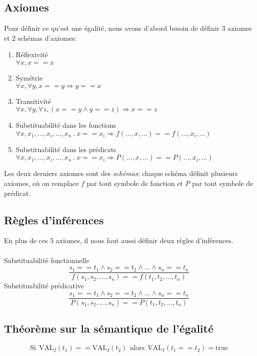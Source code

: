 {\subsection{Axiomes} 
Pour définir ce qu'est une égalité, nous avons d'abord besoin de définir 3 axiomes et 2 schémas d'axiomes:
\begin{enumerate}
\item Réflexivité \\$\forall x, x==x$
\item Symétrie \\$\forall x, \forall y, x==y \Rightarrow y==x$
\item Transitivité \\$\forall x, \forall y, \forall z, (x==y \land y==z) \Rightarrow x==z$
\item Substituabilité dans les fonctions\\$\forall x, x_{1}, ..., x_i, ..., x_{n}\ .\ x==x_i \Rightarrow f(..., x, ...) == f(..., x_i, ...)$
\item Substituabilité dans les prédicats\\$\forall x, x_{1}, ..., x_i, ..., x_{n}\ .\ x==x_i \Rightarrow P(..., x, ...) == P(..., x_i, ...)$ 
\end{enumerate}
Les deux derniers axiomes sont des {\em schémas}: chaque schéma définit plusieurs axiomes, où on remplace $f$ par tout symbole de fonction et $P$ par tout symbole de prédicat.

\subsection{Règles d'inférences}
En plus de ces 5 axiomes, il nous faut aussi définir deux règles d'inférences.\\ \\
Substituabilité fonctionnelle 
	$$ \frac{s_{1}==t_{1} \land s_{2}==t_{2} \land ... \land s_{n}==t_{n}}{f(s_{1},s_{2},...,s_{n}) == f(t_{1},t_{2},...,t_{n})}$$ 
	Substituabilité prédicative 
	$$ \frac{s_{1}==t_{1} \land s_{2}==t_{2} \land ... \land s_{n}==t_{n}}{P(s_{1},s_{2},...,s_{n}) == P(t_{1},t_{2},...,t_{n})}$$ 

\subsection{Théorème sur la sémantique de l'égalité}

$$\mathrm{Si}\ \ \mathrm{VAL}_{I}(t_{1}) ==  \mathrm{VAL}_{I}(t_{2}) \ \ \mathrm{alors}\ \  \mathrm{VAL}_{I}(t_{1} == t_{2}) = \mathrm{true}$$

}
